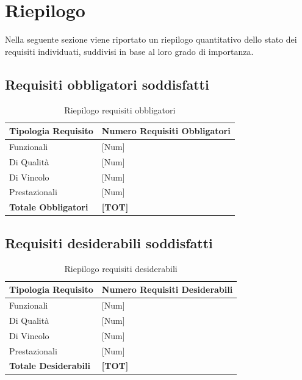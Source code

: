 \section{Riepilogo}
Nella seguente sezione viene riportato un riepilogo quantitativo dello stato dei requisiti individuati, suddivisi in base al loro grado di importanza.

\subsection{Requisiti obbligatori soddisfatti}
\begin{table}[ht]
	\centering
	\renewcommand{\arraystretch}{1.4}
	\begin{tabularx}{0.8\textwidth}{|l|X|}
		\hline
		\rowcolor{primarycolor!10}
		\textbf{Tipologia Requisito} & \textbf{Numero Requisiti Obbligatori} \\
		\hline
		Funzionali & [Num] \\
		\hline
		Di Qualità & [Num] \\
		\hline
		Di Vincolo & [Num] \\
		\hline
		Prestazionali & [Num] \\
		\hline
		\textbf{Totale Obbligatori} & \textbf{[TOT]} \\
		\hline
	\end{tabularx}
	\caption{Riepilogo requisiti obbligatori}
\end{table}

\subsection{Requisiti desiderabili soddisfatti}
\begin{table}[ht]
	\centering
	\renewcommand{\arraystretch}{1.4}
	\begin{tabularx}{0.8\textwidth}{|l|X|}
		\hline
		\rowcolor{primarycolor!10}
		\textbf{Tipologia Requisito} & \textbf{Numero Requisiti Desiderabili} \\
		\hline
		Funzionali & [Num] \\
		\hline
		Di Qualità & [Num] \\
		\hline
		Di Vincolo & [Num] \\
		\hline
		Prestazionali & [Num] \\
		\hline
		\textbf{Totale Desiderabili} & \textbf{[TOT]} \\
		\hline
	\end{tabularx}
	\caption{Riepilogo requisiti desiderabili}
\end{table}


